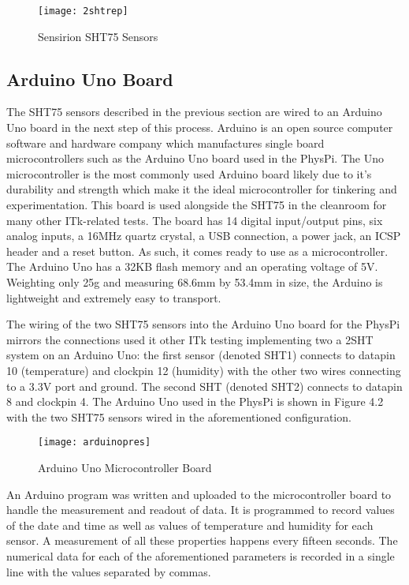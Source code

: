 \documentclass[letterpaper, 11pt]{report}
\begin{document}
\begin{figure}[h]
\centering
\texttt{[image: 2shtrep]}
\caption{Sensirion SHT75 Sensors}
\end{figure}

\subsection{Arduino Uno Board}

The SHT75 sensors described in the previous section are wired to an Arduino Uno board in the next step of this process.  Arduino is an open source computer software and hardware company which manufactures single board microcontrollers such as the Arduino Uno board used in the PhysPi. The Uno microcontroller is the most commonly used Arduino board likely due to it's durability and strength which make it the ideal microcontroller for tinkering and experimentation.  This board is used alongside the SHT75 in the cleanroom for many other ITk-related tests.  The board has 14 digital input/output pins, six analog inputs, a 16MHz quartz crystal, a USB connection, a power jack, an ICSP header and a reset button.  As such, it comes ready to use as a microcontroller.  The Arduino Uno has a 32KB flash memory and an operating voltage of 5V.  Weighting only 25g and measuring 68.6mm by 53.4mm in size, the Arduino is lightweight and extremely easy to transport.

The wiring of the two SHT75 sensors into the Arduino Uno board for the PhysPi mirrors the connections used it other ITk testing implementing two a 2SHT system on an Arduino Uno: the first sensor (denoted SHT1) connects to datapin 10 (temperature) and clockpin 12 (humidity) with the other two wires connecting to a 3.3V port and ground.  The second SHT (denoted SHT2) connects to datapin 8 and clockpin 4.  The Arduino Uno used in the PhysPi is shown in Figure 4.2 with the two SHT75 sensors wired in the aforementioned configuration.

\begin{figure}[h]
\centering
\texttt{[image: arduinopres]}
\caption{Arduino Uno Microcontroller Board}
\end{figure}

An Arduino program was written and uploaded to the microcontroller board to handle the measurement and readout of data.  It is programmed to record values of the date and time as well as values of temperature and humidity for each sensor.  A measurement of all these properties happens every fifteen seconds.  The numerical data for each of the aforementioned parameters is recorded in a single line with the values separated by commas.
\end{document}
